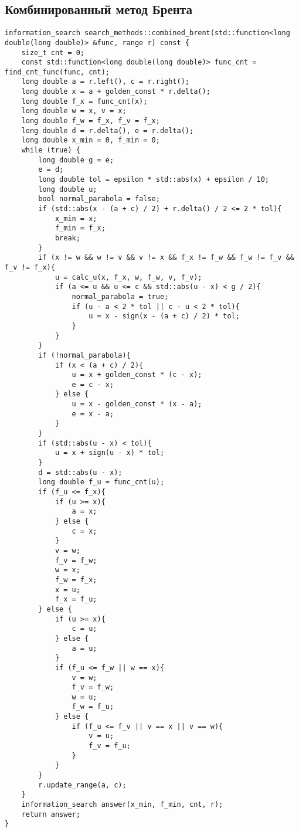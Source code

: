 \newpage
\subsection{Комбинированный метод Брента}
\begin{lstlisting}
information_search search_methods::combined_brent(std::function<long double(long double)> &func, range r) const {
    size_t cnt = 0;
    const std::function<long double(long double)> func_cnt = find_cnt_func(func, cnt);
    long double a = r.left(), c = r.right();
    long double x = a + golden_const * r.delta();
    long double f_x = func_cnt(x);
    long double w = x, v = x;
    long double f_w = f_x, f_v = f_x;
    long double d = r.delta(), e = r.delta();
    long double x_min = 0, f_min = 0;
    while (true) {
        long double g = e;
        e = d;
        long double tol = epsilon * std::abs(x) + epsilon / 10;
        long double u;
        bool normal_parabola = false;
        if (std::abs(x - (a + c) / 2) + r.delta() / 2 <= 2 * tol){
            x_min = x;
            f_min = f_x;
            break;
        }
        if (x != w && w != v && v != x && f_x != f_w && f_w != f_v && f_v != f_x){
            u = calc_u(x, f_x, w, f_w, v, f_v);
            if (a <= u && u <= c && std::abs(u - x) < g / 2){
                normal_parabola = true;
                if (u - a < 2 * tol || c - u < 2 * tol){
                    u = x - sign(x - (a + c) / 2) * tol;
                }
            }
        }
        if (!normal_parabola){
            if (x < (a + c) / 2){
                u = x + golden_const * (c - x);
                e = c - x;
            } else {
                u = x - golden_const * (x - a);
                e = x - a;
            }
        }
        if (std::abs(u - x) < tol){
            u = x + sign(u - x) * tol;
        }
        d = std::abs(u - x);
        long double f_u = func_cnt(u);
        if (f_u <= f_x){
            if (u >= x){
                a = x;
            } else {
                c = x;
            }
            v = w;
            f_v = f_w;
            w = x;
            f_w = f_x;
            x = u;
            f_x = f_u;
        } else {
            if (u >= x){
                c = u;
            } else {
                a = u;
            }
            if (f_u <= f_w || w == x){
                v = w;
                f_v = f_w;
                w = u;
                f_w = f_u;
            } else {
                if (f_u <= f_v || v == x || v == w){
                    v = u;
                    f_v = f_u;
                }
            }
        }
        r.update_range(a, c);
    }
    information_search answer(x_min, f_min, cnt, r);
    return answer;
}
\end{lstlisting}
